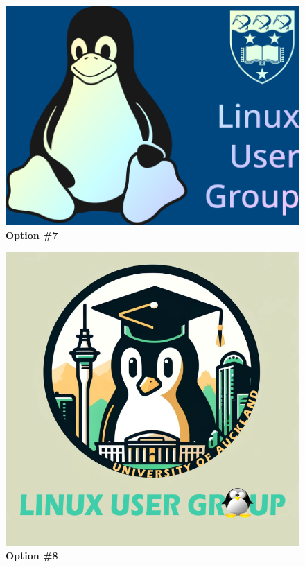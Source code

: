 \documentclass[11pt,fleqn]{article}
\begin{document}
\begin{figure}
  \centering
  \includegraphics[width=0.56\linewidth]{res/7-lug-logo-blue.png}
  \caption*{\Large{\textbf{Option \#7}}}
\end{figure}

\begin{figure}
  \centering
  \includegraphics[width=0.56\linewidth]{res/8.png}
  \caption*{\Large{\textbf{Option \#8}}}
\end{figure}
\end{document}
